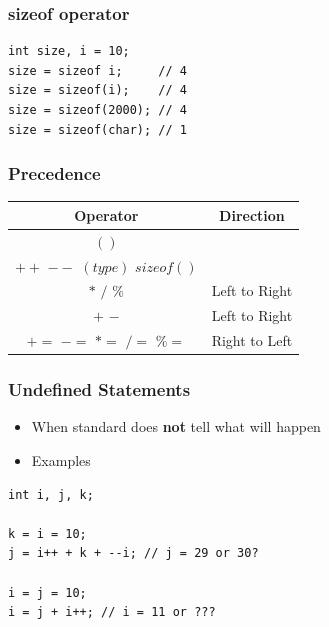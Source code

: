 \documentclass{../c-lecture}
\begin{document}
\begin{frame}[fragile]
  \frametitle{sizeof operator}
  \begin{verbatim}
int size, i = 10;
size = sizeof i;     // 4
size = sizeof(i);    // 4
size = sizeof(2000); // 4
size = sizeof(char); // 1
  \end{verbatim}
\end{frame}

\begin{frame}
  \frametitle{Precedence}
  \begin{table}
  \begin{tabular}{cc}
    \toprule

    Operator &
    Direction \\

    \midrule

    $( )$&
    \\

    \midrule

    $++$ $--$ $(type)$ $sizeof()$ &
    \\

    \midrule

    $*$ $/$ $\%$ &
    Left to Right \\

    \midrule

    $+$ $-$ &
    Left to Right \\

    \midrule

    $+=$ $-=$ $*=$ $/=$ $\%=$ &
    Right to Left \\

    \bottomrule
  \end{tabular}
  \end{table}
\end{frame}

\begin{frame}[fragile]
  \frametitle{Undefined Statements}
  \begin{itemize}
    \item
      When standard does \textbf{\color{RubineRed} not} tell what will
      happen
    \item Examples
  \end{itemize}
  \begin{verbatim}
int i, j, k;

k = i = 10;
j = i++ + k + --i; // j = 29 or 30?

i = j = 10;
i = j + i++; // i = 11 or ???
  \end{verbatim}
\end{frame}
\end{document}
